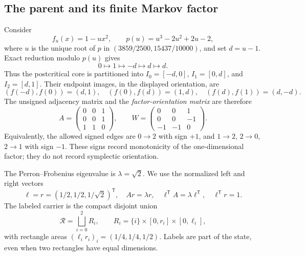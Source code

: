 \documentclass[11pt]{article}
\theoremstyle{definition}
\theoremstyle{remark}
\begin{document}
\subsection{The parent and its finite Markov factor}

Consider
\begin{equation}
 f_u(x)=1-u x^2,
 \qquad
 p(u)=u^3-2u^2+2u-2,
 \label{eq:parent}
\end{equation}
where \(u\) is the unique root of \(p\) in
\((3859/2500,15437/10000)\), and set \(d=u-1\).  Exact reduction modulo
\(p(u)\) gives
\begin{equation}
 0\longmapsto1\longmapsto-d\longmapsto d\longmapsto d.
 \label{eq:pcf-orbit}
\end{equation}
Thus the postcritical core is partitioned into
\(I_0=[-d,0]\), \(I_1=[0,d]\), and \(I_2=[d,1]\).  Their endpoint
images, in the displayed orientation, are
\begin{equation}
 (f(-d),f(0))=(d,1),\quad
 (f(0),f(d))=(1,d),\quad
 (f(d),f(1))=(d,-d).
 \label{eq:endpoint-images}
\end{equation}
The unsigned adjacency matrix and the \emph{factor-orientation matrix} are
therefore
\begin{equation}
 A=\begin{pmatrix}0&0&1\\0&0&1\\1&1&0\end{pmatrix},
 \qquad
 W=\begin{pmatrix}0&0&1\\0&0&-1\\-1&-1&0\end{pmatrix}.
 \label{eq:AW}
\end{equation}
Equivalently, the allowed signed edges are
\(0\to2\) with sign \(+1\), and \(1\to2\), \(2\to0\),
\(2\to1\) with sign \(-1\).  These signs record monotonicity of the
one-dimensional factor; they do not record symplectic orientation.

The Perron--Frobenius eigenvalue is \(\lambda=\sqrt2\).  We use the
normalized left and right vectors
\begin{equation}
 \ell=r=(1/2,1/2,1/\sqrt2)^{\mathsf T},
 \quad Ar=\lambda r,
 \quad \ell^{\mathsf T}A=\lambda\ell^{\mathsf T},
 \quad \ell^{\mathsf T}r=1.
 \label{eq:pf}
\end{equation}
The labeled carrier is the compact disjoint union
\begin{equation}
 \mathcal R=\bigsqcup_{i=0}^{2}
 R_i,\qquad R_i=\{i\}\times[0,r_i]\times[0,\ell_i],
 \label{eq:carrier}
\end{equation}
with rectangle areas \((\ell_i r_i)_i=(1/4,1/4,1/2)\).
Labels are part of the state, even when two rectangles have equal dimensions.
\end{document}
